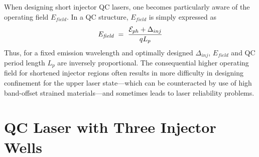 
When designing short injector QC lasers, one becomes particularly aware of the operating field $E_\textit{field}$.  In a QC structure, $E_\textit{field}$ is simply expressed as
\begin{equation}
E_\textit{field}~=~\frac{\EE_{ph} + \Delta_{inj}}{q L_p}
\end{equation}
Thus, for a fixed emission wavelength and optimally designed $\Delta_{inj}$, $E_\textit{field}$ and QC period length $L_p$ are inversely proportional. The consequential higher operating field for shortened injector regions often results in more difficulty in designing confinement for the upper laser state---which can be counteracted by use of high band-offset strained materials---and sometimes leads to laser reliability problems.


\section{QC Laser with Three Injector Wells}


